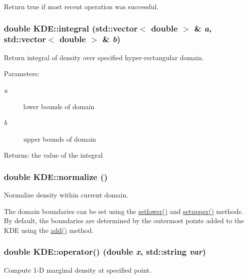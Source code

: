 Return true if most recent operation was successful. 

\hypertarget{classKDE_a13}{
\subsubsection[integral]{\setlength{\rightskip}{0pt plus 5cm}double KDE::integral (std::vector$<$ double $>$ \& {\em a}, std::vector$<$ double $>$ \& {\em b})}}
\label{classKDE_a13}


Return integral of density over specified hyper-rectangular domain. 

\begin{Desc}
\item[Parameters:]
\begin{description}
\item[{\em a}]lower bounds of domain \item[{\em b}]upper bounds of domain \end{description}
\end{Desc}
\begin{Desc}
\item[Returns:]the value of the integral \end{Desc}
\hypertarget{classKDE_a6}{
\subsubsection[normalize]{\setlength{\rightskip}{0pt plus 5cm}double KDE::normalize ()}}
\label{classKDE_a6}


Normalize density within current domain. 

The domain boundaries can be set using the \hyperlink{classKDE_a18}{setlower()} and \hyperlink{classKDE_a19}{setupper()} methods. By default, the boundaries are determined by the outermost points added to the KDE using the \hyperlink{classKDE_a4}{add()} method. \hypertarget{classKDE_a11}{
\subsubsection[operator()]{\setlength{\rightskip}{0pt plus 5cm}double KDE::operator() (double {\em x}, std::string {\em var})}}
\label{classKDE_a11}


Compute 1-D marginal density at specified point. 

